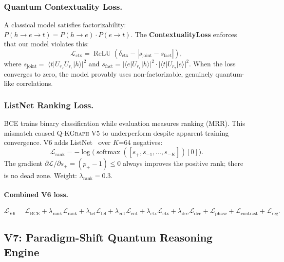 \documentclass[runningheads]{llncs}
\newcommand{\QR}{\textsc{Q-KGraph}}
\newcommand{\braket}[2]{\langle#1|#2\rangle}
\begin{document}
\subsubsection{Quantum Contextuality Loss.}

A classical model satisfies factorizability:
$P(h\to e\to t)=P(h\to e)\cdot P(e\to t)$.  The \textbf{ContextualityLoss}
enforces that our model violates this:
\begin{equation}
  \mathcal{L}_\text{ctx}
  =\operatorname{ReLU}(\delta_\text{ctx}-|s_\text{joint}-s_\text{fact}|),
  \label{eq:ctx}
\end{equation}
where $s_\text{joint}=|\braket{t}{U_{r_2}U_{r_1}|h}|^2$ and
$s_\text{fact}=|\braket{e}{U_{r_1}|h}|^2\cdot|\braket{t}{U_{r_2}|e}|^2$.
When the loss converges to zero, the model provably uses non-factorizable,
genuinely quantum-like correlations.

\subsubsection{ListNet Ranking Loss.}

BCE trains binary classification while evaluation measures ranking (MRR).
This mismatch caused \QR{} V5 to underperform despite apparent training
convergence.  V6 adds ListNet~\cite{ref_listnet} over $K$=64 negatives:
\begin{equation}
  \mathcal{L}_\text{rank}
  =-\log\bigl(\operatorname{softmax}([s_+,s_{-1},\ldots,s_{-K}])[0]\bigr).
  \label{eq:listnet}
\end{equation}
The gradient $\partial\mathcal{L}/\partial s_+=(p_+-1)\leq 0$ always
improves the positive rank; there is no dead zone.  Weight:
$\lambda_\text{rank}=0.3$.

\paragraph{Combined V6 loss.}
\[
  \mathcal{L}_\text{V6}=\mathcal{L}_\text{BCE}
  +\lambda_\text{rank}\mathcal{L}_\text{rank}
  +\lambda_\text{tel}\mathcal{L}_\text{tel}
  +\lambda_\text{ent}\mathcal{L}_\text{ent}
  +\lambda_\text{ctx}\mathcal{L}_\text{ctx}
  +\lambda_\text{dec}\mathcal{L}_\text{dec}
  +\mathcal{L}_\text{phase}+\mathcal{L}_\text{contrast}+\mathcal{L}_\text{reg}.
\]

\subsection{V7: Paradigm-Shift Quantum Reasoning Engine}
\label{sec:v7}
\end{document}
